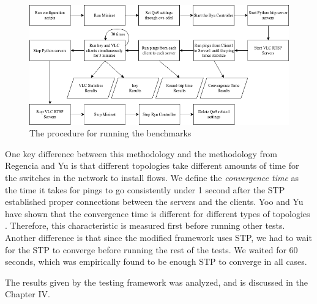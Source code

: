 \begin{figure}
    \centering
    \includegraphics[width=\textwidth]{Figures/Test Procedure.drawio.png}
    \caption{The procedure for running the benchmarks}
    \label{fig:benchmark}
\end{figure}

One key difference between this methodology and the methodology from Regencia and Yu is that different topologies take different amounts of time for the switches in the network to install flows. We define the \textit{convergence time} as the time it takes for pings to go consistently under 1 second after the STP established proper connections between the servers and the clients. Yoo and Yu have shown that the convergence time is different for different types of topologies \cite{yoo_building_2022}. Therefore, this characteristic is measured first before running other tests. Another difference is that since the modified framework uses STP, we had to wait for the STP to converge before running the rest of the tests. We waited for 60 seconds, which was empirically found to be enough STP to converge in all cases.

The results given by the testing framework was analyzed, and is discussed in the Chapter IV.
